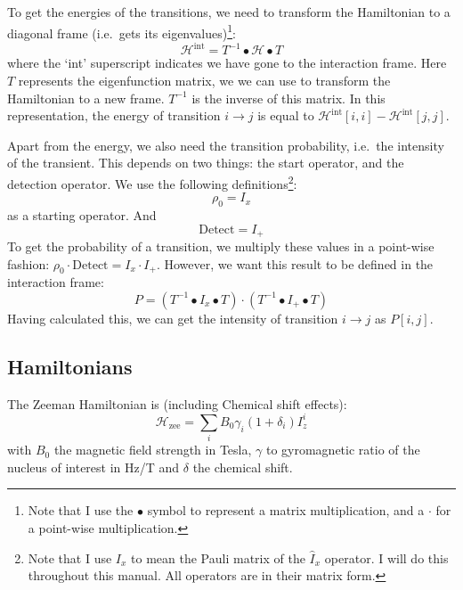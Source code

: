 \documentclass[11pt,a4paper]{article}
\begin{document}
To get the energies of the transitions, we need to transform the Hamiltonian to a diagonal
frame (i.e.\ gets its eigenvalues)\footnote{Note that I
use the $\bullet$ symbol to represent a matrix multiplication, and a $\cdot$ for a
point-wise multiplication.}:
\begin{equation}
  \mathcal{H}^\text{int} = T^{-1} \bullet \mathcal{H}\bullet T
\end{equation}
where the `int' superscript indicates we have gone to the interaction frame.  Here $T$
represents the eigenfunction matrix, we we can use to transform the Hamiltonian to a new
frame. $T^{-1}$ is the inverse of this matrix. In this representation, the energy of
transition $i \rightarrow j$ is equal to $\mathcal{H}^\text{int}[i,i] -
\mathcal{H}^\text{int}[j,j]$.

Apart from the energy, we also need the transition probability, i.e.\ the intensity of the
transient. This depends on two things: the start operator, and the detection operator. We
use the following definitions\footnote{Note that I use $I_x$ to mean the Pauli matrix of
  the $\hat{I}_x$ operator. I will do this throughout this manual. All operators are in
their matrix form.}:
\begin{equation}
  \rho_0 = I_x
\end{equation}
as a starting operator. And
\begin{equation}
  \text{Detect} = I_+
\end{equation}
To get the probability of a transition, we multiply these values in a point-wise fashion:
$\rho_0 \cdot \text{Detect} = I_x  \cdot I_+$. However, we want this result to be defined
in the interaction frame:
\begin{equation}
  P = (T^{-1} \bullet I_x \bullet T) \cdot (T^{-1} \bullet I_+\bullet T)
\end{equation}
Having calculated this, we can get the intensity of transition $i \rightarrow j$ as $P[i,j]$.

\subsection{Hamiltonians}
The Zeeman Hamiltonian is (including Chemical shift effects):
\begin{equation}
  \mathcal{H}_\text{zee} = \sum_i B_0  \gamma_i (1 + \delta_i) I_z^i
\end{equation}
with $B_0$ the magnetic field strength in Tesla, $\gamma$ to gyromagnetic ratio of the
nucleus of interest in Hz/T and $\delta$ the chemical shift.
\end{document}
